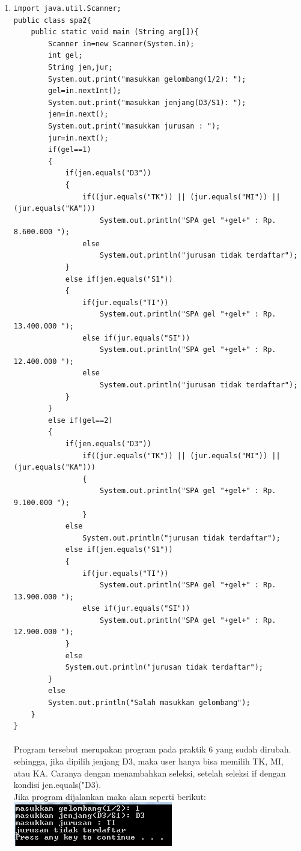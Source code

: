 \documentclass[a4paper,12pt]{article}
\begin{document}
\begin{enumerate}[label=\textbf{\arabic* .}]
            \newpage

        \item
            \begin{lstlisting}[frame=single]
import java.util.Scanner;
public class spa2{
    public static void main (String arg[]){
        Scanner in=new Scanner(System.in);
        int gel;
        String jen,jur;
        System.out.print("masukkan gelombang(1/2): ");
        gel=in.nextInt();
        System.out.print("masukkan jenjang(D3/S1): ");
        jen=in.next();
        System.out.print("masukkan jurusan : ");
        jur=in.next();
        if(gel==1)
        {
            if(jen.equals("D3"))
            {
                if((jur.equals("TK")) || (jur.equals("MI")) || (jur.equals("KA")))
                    System.out.println("SPA gel "+gel+" : Rp. 8.600.000 ");
                else
                    System.out.println("jurusan tidak terdaftar");
            }
            else if(jen.equals("S1"))
            {
                if(jur.equals("TI"))
                    System.out.println("SPA gel "+gel+" : Rp. 13.400.000 ");
                else if(jur.equals("SI"))
                    System.out.println("SPA gel "+gel+" : Rp. 12.400.000 ");
                else
                    System.out.println("jurusan tidak terdaftar");
            }
        }
        else if(gel==2)
        {
            if(jen.equals("D3"))
                if((jur.equals("TK")) || (jur.equals("MI")) || (jur.equals("KA")))
                {
                    System.out.println("SPA gel "+gel+" : Rp. 9.100.000 ");
                }
            else
                System.out.println("jurusan tidak terdaftar");
            else if(jen.equals("S1"))
            {
                if(jur.equals("TI"))
                    System.out.println("SPA gel "+gel+" : Rp. 13.900.000 ");
                else if(jur.equals("SI"))
                    System.out.println("SPA gel "+gel+" : Rp. 12.900.000 ");
            }
            else
            System.out.println("jurusan tidak terdaftar");
        }
        else
        System.out.println("Salah masukkan gelombang");
    }
}                
            \end{lstlisting}
            \paragraph{}
            Program tersebut merupakan program pada praktik 6 yang sudah dirubah. sehingga, jika dipilih jenjang D3, maka user hanya bisa memilih TK, MI, atau
            KA. Caranya dengan menambahkan seleksi, setelah seleksi if dengan kondisi jen.equals("D3).\\
            Jika program dijalankan maka akan seperti berikut:\\
            \includegraphics{08b.PNG}


\end{enumerate}
\end{document}
